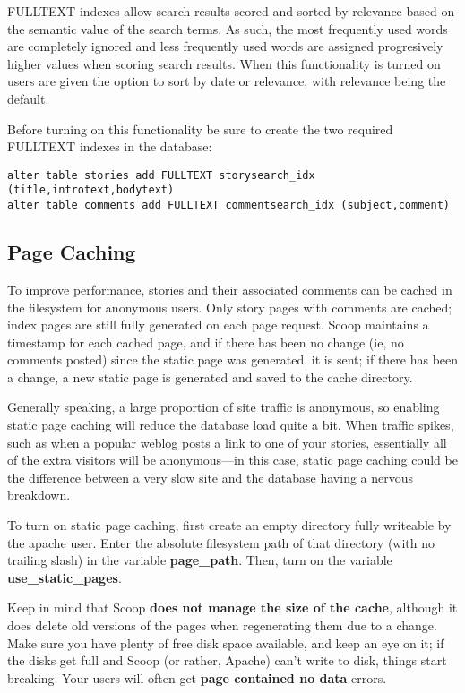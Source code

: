 FULLTEXT indexes allow search results scored and sorted by relevance based on the semantic value of the search terms. As such, the most frequently used words are completely ignored and less frequently used words are assigned progresively higher values when scoring search results. When this functionality is turned on users are given the option to sort by date or relevance, with relevance being the default.

Before turning on this functionality be sure to create the two required FULLTEXT indexes in the database:
\begin{verbatim}
alter table stories add FULLTEXT storysearch_idx (title,introtext,bodytext)
alter table comments add FULLTEXT commentsearch_idx (subject,comment)
\end{verbatim}

\subsection{Page Caching}
\label{features-static-page-caching}

To improve performance, stories and their associated comments can be cached in the filesystem for anonymous users.  Only story pages with comments are cached; index pages are still fully generated on each page request.  Scoop maintains a timestamp for each cached page, and if there has been no change (ie, no comments posted) since the static page was generated, it is sent; if there has been a change, a new static page is generated and saved to the cache directory.

Generally speaking, a large proportion of site traffic is anonymous, so enabling static page caching will reduce the database load quite a bit.  When traffic spikes, such as when a popular weblog posts a link to one of your stories, essentially all of the extra visitors will be anonymous---in this case, static page caching could be the difference between a very slow site and the database having a nervous breakdown.

To turn on static page caching, first create an empty directory fully writeable by the apache user.  Enter the absolute filesystem path of that directory (with no trailing slash) in the variable {\bf page\_path}.  Then, turn on the variable {\bf use\_static\_pages}.

Keep in mind that Scoop {\bf does not manage the size of the cache}, although it does delete old versions of the pages when regenerating them due to a change.  Make sure you have plenty of free disk space available, and keep an eye on it; if the disks get full and Scoop (or rather, Apache) can't write to disk, things start breaking.  Your users will often get {\bf page contained no data} errors.  

